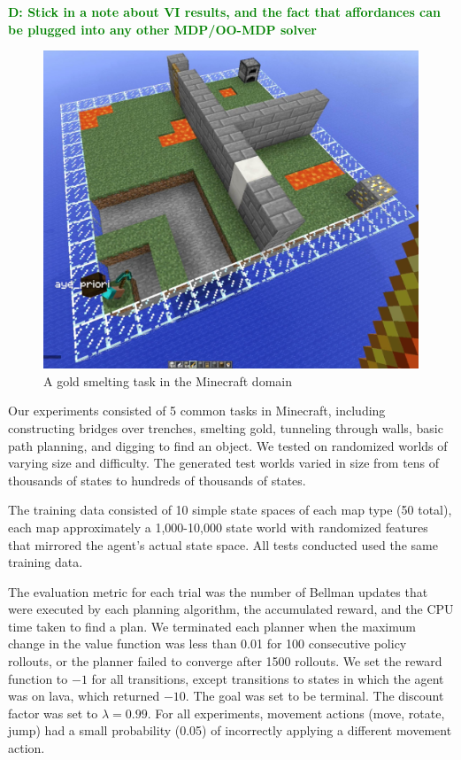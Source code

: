 \documentclass[conference]{IEEEtran}
\newcommand{\dnote}[1]{\textcolor{Green}{\textbf{D: #1}}}
\begin{document}
\dnote{Stick in a note about VI results, and the fact that affordances can be plugged into
any other MDP/OO-MDP solver}

\begin{figure}[t]
\centering
\includegraphics[scale=0.13]{figures/epicworld_1.jpg}%
  \caption{A gold smelting task in the Minecraft domain}
  \label{fig:minecraft}
\end{figure}

Our experiments consisted of 5 common tasks in Minecraft, including
constructing bridges over trenches, smelting gold, tunneling
through walls, basic path planning, and digging to find an object.  We tested on 
randomized worlds of varying size and difficulty. The generated test
worlds varied in size from tens of thousands of states to hundreds of thousands of states.

The training data consisted of 10 simple state spaces of each map type
(50 total), each map approximately a 1,000-10,000 state world with
randomized features that mirrored the agent's actual state space. All tests
conducted used the same training data.

The evaluation metric for each trial was the number of Bellman updates
that were executed by each planning algorithm, the accumulated reward,
and the CPU time taken to find a plan.  We terminated each planner
when the maximum change in the value function was less than 0.01 for
100 consecutive policy rollouts, or the planner failed to converge
after 1500 rollouts.  We set the reward function to $-1$ for all
transitions, except transitions to states in which the agent was on
lava, which returned $-10$. The goal was set to be terminal. The
discount factor was set to $\lambda = 0.99$. For all experiments,
movement actions (move, rotate, jump) had a small probability (0.05)
of incorrectly applying a different movement action.
\end{document}
